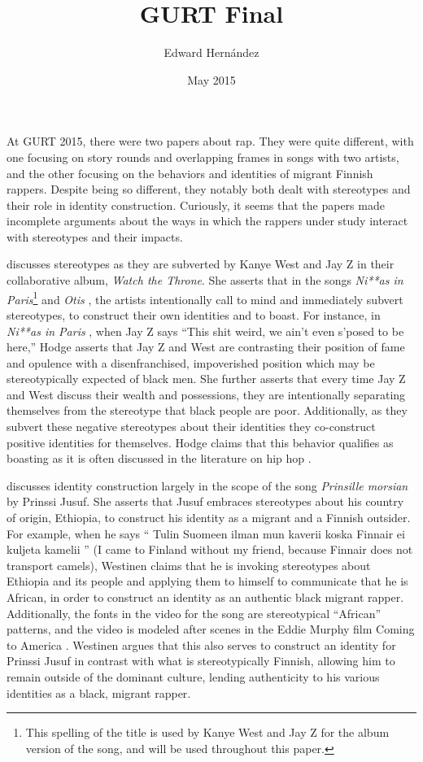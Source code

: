 \documentclass[man,12pt,natbib]{apa6}
\begin{document}
\title{GURT Final}
\author{Edward Hern\'{a}ndez}
\date{May 2015}
\maketitle

At GURT 2015, there were two papers about rap.  They were quite different, with
one focusing on story rounds and overlapping frames in songs with two artists,
and the other focusing on the behaviors and identities of migrant Finnish
rappers.  Despite being so different, they notably both dealt with stereotypes
and their role in identity construction.  Curiously, it seems that the papers
made incomplete arguments about the ways in which the rappers under study
interact with stereotypes and their impacts. 

\citet{Hodge15} discusses stereotypes as they are subverted by Kanye West and
Jay Z in their collaborative album, \emph{Watch the Throne}.  She asserts that
in the songs \emph{Ni**as in Paris}\footnote{This spelling of the title is used
	by Kanye West and Jay Z for the album version of the song, and will be used
throughout this paper.} \citep{West11a} and \emph{Otis} \citep{West11b}, the
artists intentionally call to mind and immediately subvert stereotypes, to
construct their own identities and to boast. For instance, in \emph{Ni**as in
Paris} , when Jay Z says ``This shit weird, we ain't even s'posed to be here,''
Hodge asserts that Jay Z and West are contrasting their position of fame and
opulence with a disenfranchised, impoverished position which may be
stereotypically expected of black men.  She further asserts that every time Jay
Z and West discuss their wealth and possessions, they are intentionally
separating themselves from the stereotype that black people are poor.
Additionally, as they subvert these negative stereotypes about their identities
they co-construct positive identities for themselves.  Hodge claims that this
behavior qualifies as boasting as it is often discussed in the literature on
hip hop \citep{Rickford00}. 

\citet{Westinen15} discusses identity construction largely in the scope of the
song \emph{Prinsille morsian} \citep{Palmunen14} by Prinssi Jusuf.  She asserts
that Jusuf embraces stereotypes about his country of origin, Ethiopia, to
construct his identity as a migrant and a Finnish outsider.  For example, when
he says `` Tulin Suomeen ilman mun kaverii koska Finnair ei kuljeta kamelii ''
(I came to Finland without my friend, because Finnair does not transport
camels), Westinen claims that he is invoking stereotypes about Ethiopia and its
people and applying them to himself to communicate that he is African, in order
to construct an identity as an authentic black migrant rapper.  Additionally,
the fonts in the video for the song are stereotypical ``African'' patterns, and
the video is modeled after scenes in the Eddie Murphy film Coming to America .
Westinen argues that this also serves to construct an identity for Prinssi
Jusuf in contrast with what is stereotypically Finnish, allowing him to remain
outside of the dominant culture, lending authenticity to his various identities
as a black, migrant rapper. 
\end{document}
